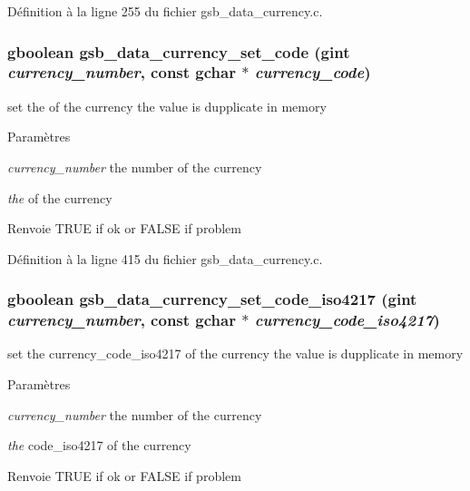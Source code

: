 Définition à la ligne 255 du fichier gsb\_\-data\_\-currency.c.

\subsubsection[{gsb\_\-data\_\-currency\_\-set\_\-code}]{\setlength{\rightskip}{0pt plus 5cm}gboolean gsb\_\-data\_\-currency\_\-set\_\-code (gint {\em currency\_\-number}, \/  const gchar $\ast$ {\em currency\_\-code})}\label{gsb__data__currency_8c_a94d85b5a948e43a4df652c4c8c60dd8b}
set the of the currency the value is dupplicate in memory


\begin{DoxyParams}{Paramètres}
\item[{\em currency\_\-number}]the number of the currency \item[{\em the}]of the currency\end{DoxyParams}
\begin{DoxyReturn}{Renvoie}
TRUE if ok or FALSE if problem 
\end{DoxyReturn}


Définition à la ligne 415 du fichier gsb\_\-data\_\-currency.c.

\subsubsection[{gsb\_\-data\_\-currency\_\-set\_\-code\_\-iso4217}]{\setlength{\rightskip}{0pt plus 5cm}gboolean gsb\_\-data\_\-currency\_\-set\_\-code\_\-iso4217 (gint {\em currency\_\-number}, \/  const gchar $\ast$ {\em currency\_\-code\_\-iso4217})}\label{gsb__data__currency_8c_a79611173faac5c36794d84e8bbd039e5}
set the currency\_\-code\_\-iso4217 of the currency the value is dupplicate in memory


\begin{DoxyParams}{Paramètres}
\item[{\em currency\_\-number}]the number of the currency \item[{\em the}]code\_\-iso4217 of the currency\end{DoxyParams}
\begin{DoxyReturn}{Renvoie}
TRUE if ok or FALSE if problem 
\end{DoxyReturn}


